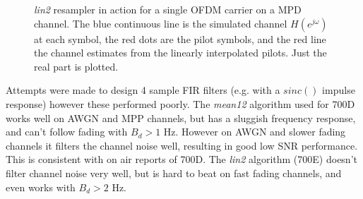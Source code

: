 \documentclass{article}
\begin{document}
\begin{figure}[h]
\caption{\emph{lin2} resampler in action for a single OFDM carrier on a MPD channel. The blue continuous line is the simulated channel $H(e^{j \omega})$ at each symbol, the red dots are the pilot symbols, and the red line the channel estimates from the linearly interpolated pilots.  Just the real part is plotted.}
\label{fig:interpolator}
\begin{center}

\end{center}
\end{figure}

Attempts were made to design 4 sample FIR filters (e.g. with a $sinc()$ impulse response) however these performed poorly. The \emph{mean12} algorithm used for 700D works well on AWGN and MPP channels, but has a sluggish frequency response, and can't follow fading with $B_d>1$ Hz.  However on AWGN and slower fading channels it filters the channel noise well, resulting in good low SNR performance.  This is consistent with on air reports of 700D. The \emph{lin2} algorithm (700E) doesn't filter channel noise very well, but is hard to beat on fast fading channels, and even works with $B_d>2$ Hz.
\end{document}
